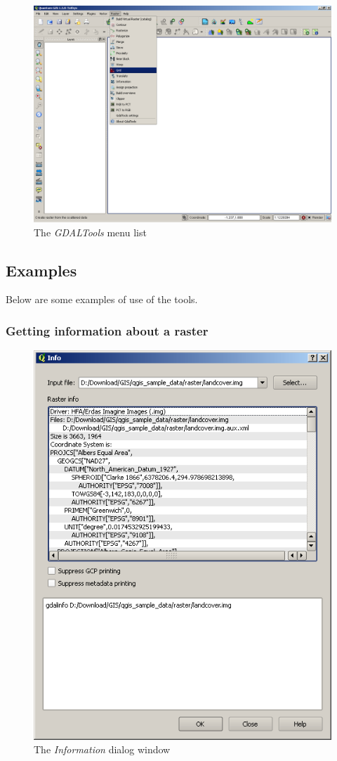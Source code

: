 {\begin{figure}[ht]
   \centering
   \caption{The \emph{GDALTools} menu list \nixcaption}\label{gdaltools_menu}
   \includegraphics[clip=true, width=12cm]{plugins_gdaltools_images/raster_menu}
\end{figure}

\subsection{Examples}\label{gdal_examples}
Below are some examples of use of the tools.
\subsubsection{Getting information about a raster}
\begin{figure}[ht]
   \centering
   \caption{The \emph{Information} dialog window \nixcaption}\label{gdalinfo}
   \includegraphics[clip=true, width=12cm]{plugins_gdaltools_images/gdalinfo}
\end{figure}

}
